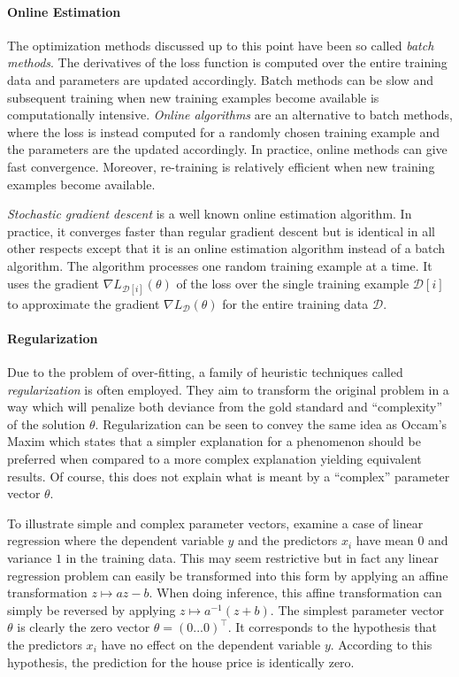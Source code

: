 \paragraph{Online Estimation} The optimization methods
discussed up to this point have been so called {\it batch
  methods}. The derivatives of the loss function is computed over the
entire training data and parameters are updated accordingly. Batch
methods can be slow and subsequent training when new training examples
become available is computationally intensive. {\it Online algorithms}
are an alternative to batch methods, where the loss is instead
computed for a randomly chosen training example and the parameters are
the updated accordingly. In practice, online methods
can give fast convergence. Moreover, re-training is relatively
efficient when new training examples become available.

{\it Stochastic gradient descent} is a well known online estimation
algorithm. In practice, it converges faster than regular gradient
descent \cite{someone} but is identical in all other respects except
that it is an online estimation algorithm instead of a batch
algorithm. The algorithm processes one random training example at a
time. It uses the gradient $\nabla L_{\mathcal{D}[i]}(\theta)$ of the
loss over the single training example $\mathcal{D}[i]$ to approximate
the gradient $\nabla L_{\mathcal{D}}(\theta)$ for the entire training
data $\mathcal{D}$. 


\paragraph{Regularization} Due to the problem of over-fitting, a
family of heuristic techniques called {\it regularization} is often
employed. They aim to transform the original problem in a way which
will penalize both deviance from the gold standard and ``complexity''
of the solution $\theta$. Regularization can be seen to convey the
same idea as Occam's Maxim which states that a simpler explanation for
a phenomenon should be preferred when compared to a more complex
explanation yielding equivalent results. Of course, this does not
explain what is meant by a ``complex'' parameter vector
$\theta$.

To illustrate simple and complex parameter vectors, examine a case of
linear regression where the dependent variable $y$ and the predictors
$x_i$ have mean $0$ and variance $1$ in the training data. This may
seem restrictive but in fact any linear regression problem can easily
be transformed into this form by applying an affine transformation $z
\mapsto az - b$. When doing inference, this affine transformation can
simply be reversed by applying $z \mapsto a^{-1} (z + b)$. The
simplest parameter vector $\theta$ is clearly the zero vector $\theta
= (0 ... 0)^\top$. It corresponds to the hypothesis that the
predictors $x_i$ have no effect on the dependent variable
$y$. According to this hypothesis, the prediction for the house price
is identically zero.

